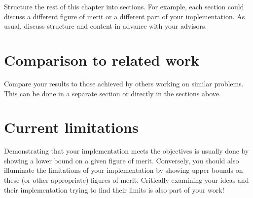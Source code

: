 Structure the rest of this chapter into sections.
For example, each section could discuss a different figure of merit or a different part of your implementation.
As usual, discuss structure and content in advance with your advisors.

\section{Comparison to related work}

Compare your results to those achieved by others working on similar problems.
This can be done in a separate section or directly in the sections above.

\section{Current limitations}

Demonstrating that your implementation meets the objectives is usually done by showing a lower bound on a given figure of merit.
Conversely, you should also illuminate the limitations of your implementation by showing upper bounds on these (or other appropriate) figures of merit.
Critically examining your ideas and their implementation trying to find their limits is also part of your work!
